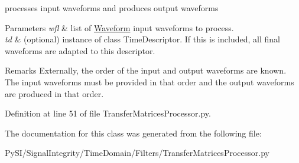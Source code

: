 processes input waveforms and produces output waveforms 


\begin{DoxyParams}{Parameters}
{\em wfl} & list of \hyperlink{namespaceSignalIntegrity_1_1TimeDomain_1_1Waveform}{Waveform} input waveforms to process. \\
\hline
{\em td} & (optional) instance of class Time\+Descriptor. If this is included, all final waveforms are adapted to this descriptor. \\
\hline
\end{DoxyParams}
\begin{DoxyRemark}{Remarks}
Externally, the order of the input and output waveforms are known. The input waveforms must be provided in that order and the output waveforms are produced in that order. 
\end{DoxyRemark}


Definition at line 51 of file Transfer\+Matrices\+Processor.\+py.



The documentation for this class was generated from the following file\+:\begin{DoxyCompactItemize}
\item 
Py\+S\+I/\+Signal\+Integrity/\+Time\+Domain/\+Filters/Transfer\+Matrices\+Processor.\+py\end{DoxyCompactItemize}
